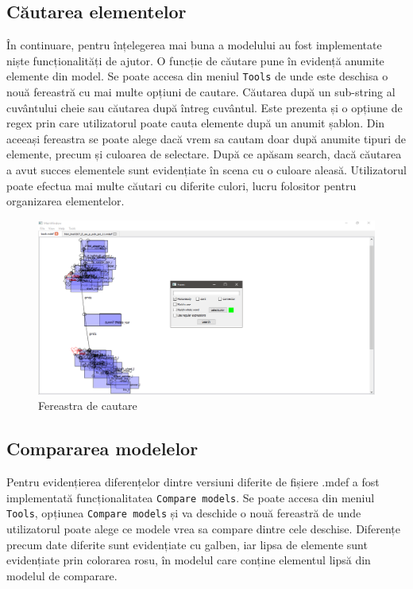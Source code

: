 \subsection{Căutarea elementelor}
În continuare, pentru înțelegerea mai buna a modelului au fost implementate niște funcționalități de ajutor. 
O funcție de căutare pune în evidență anumite elemente din model. Se poate accesa din meniul \verb|Tools| de unde este deschisa o nouă fereastră cu mai multe opțiuni de cautare. 
Căutarea după un sub-string al cuvântului cheie sau căutarea după întreg cuvântul. Este prezenta și o opțiune de regex prin care utilizatorul poate 
cauta elemente după un anumit șablon. Din aceeași fereastra se poate alege dacă vrem sa cautam doar după anumite tipuri 
de elemente, precum și culoarea de selectare. După ce apăsam search, dacă căutarea a avut succes elementele sunt evidențiate în scena cu o culoare aleasă.
Utilizatorul poate efectua mai multe căutari cu diferite culori, lucru folositor pentru organizarea elementelor. 

\begin{figure}[H]
    \includegraphics[width=\linewidth]{imagini/implementare/searchwindow.png}
    \caption{Fereastra de cautare}
    \label{fig:tabs}
\end{figure}

\subsection{Compararea modelelor}
Pentru evidențierea diferențelor dintre versiuni diferite de 
fișiere .mdef a fost implementată funcționalitatea \verb|Compare models|. Se poate accesa din meniul \verb|Tools|, opțiunea \verb|Compare models| și va deschide 
o nouă fereastră de unde utilizatorul poate alege ce modele vrea sa compare dintre cele deschise. Diferențe precum date diferite sunt evidențiate cu galben,
iar lipsa de elemente sunt evidențiate prin colorarea rosu, în modelul care conține elementul lipsă din modelul de comparare.\newline 

